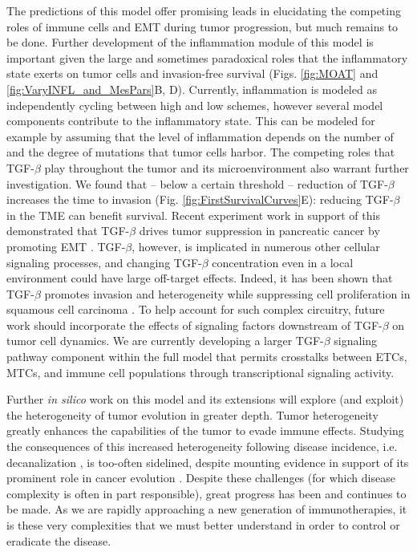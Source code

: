 \documentclass[11pt]{article}
\begin{document}
\par
The predictions of this model offer promising leads in elucidating the competing roles of immune cells and EMT during tumor progression, but much remains to be done. Further development of the inflammation module of this model is important given the large and sometimes paradoxical roles that the inflammatory state exerts on tumor cells and invasion-free survival (Figs. \ref{fig:MOAT} and \ref{fig:VaryINFL_and_MesPars}B, D). Currently, inflammation is modeled as independently cycling between high and low schemes, however several model components contribute to the inflammatory state. This can be modeled for example by assuming that the level of inflammation depends on the number of and the degree of mutations that tumor cells harbor.
The competing roles that TGF-$\beta$ play throughout the tumor and its microenvironment also warrant further investigation. We found that -- below a certain threshold -- reduction of TGF-$\beta$ increases the time to invasion (Fig. \ref{fig:FirstSurvivalCurves}E): reducing  TGF-$\beta$ in the TME can benefit survival. Recent experiment work in support of this demonstrated that TGF-$\beta$ drives tumor suppression in pancreatic cancer by promoting EMT \cite{david16_tgfv}. TGF-$\beta$, however, is implicated in numerous other cellular signaling processes, and changing TGF-$\beta$ concentration even in a local environment could have large off-target effects. Indeed, it has been shown that TGF-$\beta$ promotes invasion and heterogeneity while  suppressing cell proliferation in squamous cell carcinoma \cite{oshimori15_tgfv}. To help account for such complex circuitry, future work should incorporate the effects of signaling factors downstream of TGF-$\beta$ on tumor cell dynamics. We are currently developing a larger TGF-$\beta$ signaling pathway component within the full model that permits crosstalks between ETCs, MTCs, and immune cell populations through transcriptional signaling activity.
\par
Further {\em in silico} work on this model and its extensions will explore (and exploit) the heterogeneity of tumor evolution in greater depth. Tumor heterogeneity greatly enhances the capabilities of the tumor to evade immune effects. Studying the consequences of this increased heterogeneity following disease incidence, i.e. decanalization \cite{gibson09_decanalization}, is too-often sidelined, despite mounting evidence in support of its prominent role in cancer evolution \cite{cyll17_tumour, punt17_tumour, dagogo-jack18_tumour}. Despite these challenges (for which disease complexity is often in part responsible), great progress has been and continues to be made. As we are rapidly approaching a new generation of immunotherapies, it is these very complexities that we must better understand in order to control or eradicate the disease.
\end{document}

